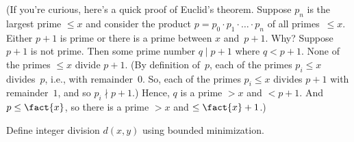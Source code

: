 \documentclass[../../../include/open-logic-section]{subfiles}
\begin{document}
(If you're curious, here's a quick proof of Euclid's theorem. Suppose
$p_n$ is the largest prime $\le x$ and consider the product $p =
p_0\cdot p_1 \cdot \dots \cdot p_n$ of all primes~$\le x$. Either
$p+1$ is prime or there is a prime between $x$ and~$p+1$.  Why?
Suppose $p+1$ is not prime. Then some prime number $q \mid p+1$ where
$q < p+1$. None of the primes $\le x$ divide $p+1$. (By definition
of~$p$, each of the primes $p_i \le x$ divides~$p$, i.e., with
remainder~$0$. So, each of the primes $p_i \le x$ divides $p+1$ with
remainder~$1$, and so $p_i \nmid p+1$.)  Hence, $q$ is a prime $>
x$ and $< p+1$.  And $p \le \fact{x}$, so there is a prime $> x$ and $\le
\fact{x}+1$.)

\begin{prob}
Define integer division $d(x, y)$ using bounded minimization.
\end{prob}
\end{document}
